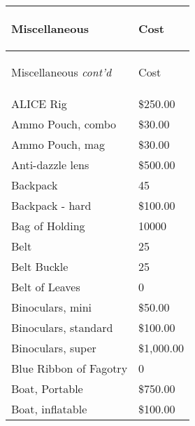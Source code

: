 \documentclass[twoside]{book}
\begin{document}
\begin{longtable}{p{1.25in}l} 
  Miscellaneous
  &
  \begin{turn}{70}{Cost}\end{turn}
          
  \\
  \hline
  \hline
  \endfirsthead
  Miscellaneous \textit{cont'd}
        
  &
  \begin{turn}{70}{Cost}\end{turn}
          
  \\
  \hline
  \endhead
      
  \raggedright
           ALICE Rig 
  &
   \$250.00 
  \tabularnewline
      
  \raggedright
           Ammo Pouch, combo 
  &
   \$30.00 
  \tabularnewline
      
  \raggedright
           Ammo Pouch, mag 
  &
   \$30.00 
  \tabularnewline
      
  \raggedright
           Anti-dazzle lens 
  &
   \$500.00 
  \tabularnewline
      
  \raggedright
           Backpack 
  &
   45 
  \tabularnewline
      
  \raggedright
           Backpack - hard 
  &
   \$100.00 
  \tabularnewline
      
  \raggedright
           Bag of Holding 
  &
   10000 
  \tabularnewline
      
  \raggedright
           Belt 
  &
   25 
  \tabularnewline
      
  \raggedright
           Belt Buckle 
  &
   25 
  \tabularnewline
      
  \raggedright
           Belt of Leaves 
  &
   0 
  \tabularnewline
      
  \raggedright
           Binoculars, mini 
  &
   \$50.00 
  \tabularnewline
      
  \raggedright
           Binoculars, standard 
  &
   \$100.00 
  \tabularnewline
      
  \raggedright
           Binoculars, super 
  &
   \$1,000.00 
  \tabularnewline
      
  \raggedright
           Blue Ribbon of Fagotry 
  &
   0 
  \tabularnewline
      
  \raggedright
           Boat, Portable 
  &
   \$750.00 
  \tabularnewline
      
  \raggedright
           Boat, inflatable 
  &
   \$100.00 
  \tabularnewline
      

\end{longtable}
\end{document}
